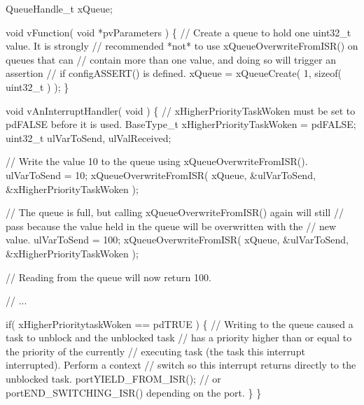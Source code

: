 \begin{DoxyPre} QueueHandle\_t xQueue;\end{DoxyPre}



\begin{DoxyPre} void vFunction( void *pvParameters )
 \{
    // Create a queue to hold one uint32\_t value.  It is strongly
    // recommended *not* to use xQueueOverwriteFromISR() on queues that can
    // contain more than one value, and doing so will trigger an assertion
    // if configASSERT() is defined.
    xQueue = xQueueCreate( 1, sizeof( uint32\_t ) );
\}\end{DoxyPre}



\begin{DoxyPre}void vAnInterruptHandler( void )
\{
// xHigherPriorityTaskWoken must be set to pdFALSE before it is used.
BaseType\_t xHigherPriorityTaskWoken = pdFALSE;
uint32\_t ulVarToSend, ulValReceived;\end{DoxyPre}



\begin{DoxyPre}    // Write the value 10 to the queue using xQueueOverwriteFromISR().
    ulVarToSend = 10;
    xQueueOverwriteFromISR( xQueue, \&ulVarToSend, \&xHigherPriorityTaskWoken );\end{DoxyPre}



\begin{DoxyPre}    // The queue is full, but calling xQueueOverwriteFromISR() again will still
    // pass because the value held in the queue will be overwritten with the
    // new value.
    ulVarToSend = 100;
    xQueueOverwriteFromISR( xQueue, \&ulVarToSend, \&xHigherPriorityTaskWoken );\end{DoxyPre}



\begin{DoxyPre}    // Reading from the queue will now return 100.\end{DoxyPre}



\begin{DoxyPre}    // ...\end{DoxyPre}



\begin{DoxyPre}    if( xHigherPrioritytaskWoken == pdTRUE )
    \{
        // Writing to the queue caused a task to unblock and the unblocked task
        // has a priority higher than or equal to the priority of the currently
        // executing task (the task this interrupt interrupted).  Perform a context
        // switch so this interrupt returns directly to the unblocked task.
        portYIELD\_FROM\_ISR(); // or portEND\_SWITCHING\_ISR() depending on the port.
    \}
\}
 \end{DoxyPre}
 